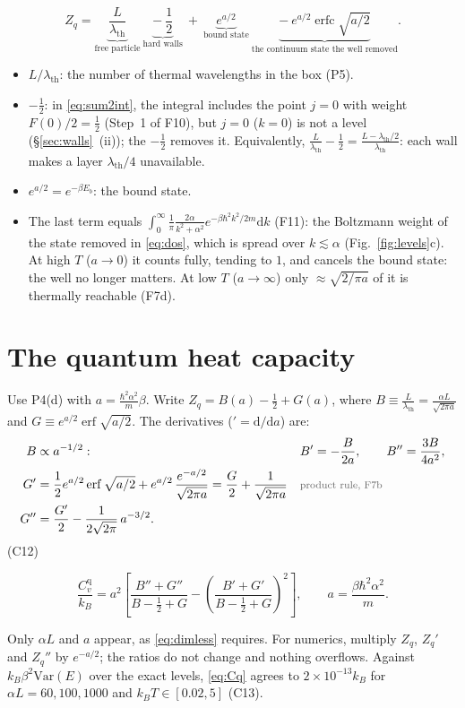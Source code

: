 \documentclass[11pt]{article}
\numberwithin{equation}{section}
\newcommand{\dd}{\mathrm{d}}
\newcommand{\erf}{\operatorname{erf}}
\newcommand{\erfc}{\operatorname{erfc}}
\newcommand{\lth}{\lambda_{\mathrm{th}}}
\newcommand{\Cq}{C_v^{\mathrm{q}}}
\newcommand{\kB}{k_B}
\newcommand{\why}[1]{\text{\footnotesize\color{whycol}#1}}
\newcommand{\own}[1]{\par\noindent{\footnotesize\textcolor{owncol}{\textsf{\textbf{Own step.}} #1}}\par}
\newcommand{\chk}[1]{{\footnotesize\textsf{(#1)}}}
\begin{document}
\begin{intuition}
\[
Z_q=\underbrace{\frac{L}{\lth}}_{\text{free particle}}\ \underbrace{-\ \frac12}_{\text{hard walls}}\ +\ \underbrace{e^{a/2}}_{\text{bound state}}\ \underbrace{-\ e^{a/2}\erfc\sqrt{a/2}}_{\text{the continuum state the well removed}}.
\]
\begin{itemize}
\item $L/\lth$: the number of thermal wavelengths in the box (P5).
\item $-\frac12$: in \eqref{eq:sum2int}, the integral includes the point $j=0$ with weight $F(0)/2=\frac12$ (Step~1 of F10), but $j=0$ ($k=0$) is not a level (\S\ref{sec:walls}~(ii)); the $-\frac12$ removes it. Equivalently, $\frac{L}{\lth}-\frac12=\frac{L-\lth/2}{\lth}$: each wall makes a layer $\lth/4$ unavailable.
\item $e^{a/2}=e^{-\beta E_b}$: the bound state.
\item The last term equals $\int_0^\infty\frac1\pi\frac{2\alpha}{k^2+\alpha^2}e^{-\beta\hbar^2k^2/2m}\dd k$ (F11): the Boltzmann weight of the state removed in \eqref{eq:dos}, which is spread over $k\lesssim\alpha$ (Fig.~\ref{fig:levels}c). At high $T$ ($a\to0$) it counts fully, tending to $1$, and cancels the bound state: the well no longer matters. At low $T$ ($a\to\infty$) only $\approx\sqrt{2/\pi a}$ of it is thermally reachable (F7d).
\end{itemize}
\end{intuition}
\own{This reading.}

\section{The quantum heat capacity}
\label{sec:Cq}
Use P4(d) with $a=\frac{\hbar^2\alpha^2}{m}\beta$. Write $Z_q=B(a)-\frac12+G(a)$, where
$B\equiv\frac{L}{\lth}=\frac{\alpha L}{\sqrt{2\pi a}}$ and $G\equiv e^{a/2}\erf\sqrt{a/2}$. The derivatives (${}'=\dd/\dd a$) are:
\begin{align}
B&\propto a^{-1/2}: && B'=-\frac{B}{2a},\qquad B''=\frac{3B}{4a^2}, \label{eq:Bder}\\
G'&=\frac12e^{a/2}\erf\sqrt{a/2}+e^{a/2}\,\frac{e^{-a/2}}{\sqrt{2\pi a}}=\frac G2+\frac{1}{\sqrt{2\pi a}} && \why{product rule, F7b} \label{eq:G1}\\
G''&=\frac{G'}2-\frac{1}{2\sqrt{2\pi}}\,a^{-3/2}. && \label{eq:G2}
\end{align}
\chk{C12}
\begin{result}
\begin{equation}
\frac{\Cq}{\kB}=a^2\left[\frac{B''+G''}{B-\frac12+G}-\left(\frac{B'+G'}{B-\frac12+G}\right)^2\right],\qquad a=\frac{\beta\hbar^2\alpha^2}{m}.
\label{eq:Cq}
\end{equation}
\end{result}
Only $\alpha L$ and $a$ appear, as \eqref{eq:dimless} requires. For numerics, multiply $Z_q$, $Z_q'$ and $Z_q''$ by $e^{-a/2}$; the ratios do not change and nothing overflows. Against $\kB\beta^2\mathrm{Var}(E)$ over the exact levels, \eqref{eq:Cq} agrees to $2\times10^{-13}\kB$ for $\alpha L=60,100,1000$ and $\kB T\in[0.02,5]$ \chk{C13}.
\end{document}
